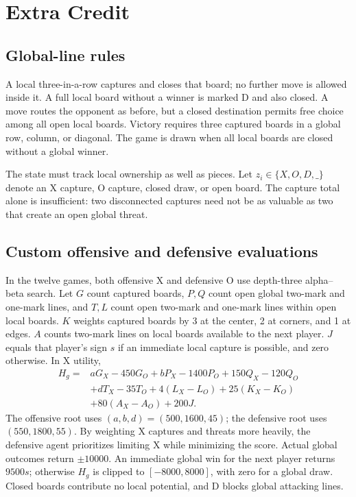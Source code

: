 \documentclass[UTF8,fontset=fandol,11pt,a4paper]{ctexart}
\begin{document}
\clearpage
\section{Extra Credit}
\subsection{Global-line rules}
A local three-in-a-row captures and closes that board; no further move
is allowed inside it. A full local board without a winner is marked D
and also closed. A move routes the opponent as before, but a closed
destination permits free choice among all open local boards. Victory
requires three captured boards in a global row, column, or diagonal.
The game is drawn when all local boards are closed without a global winner.

The state must track local ownership as well as pieces. Let
$z_i\in\{X,O,D,\_\}$ denote an X capture, O capture, closed draw, or open
board. The capture total alone is insufficient: two disconnected captures
need not be as valuable as two that create an open global threat.

\subsection{Custom offensive and defensive evaluations}
In the twelve games, both offensive X and defensive O
use depth-three alpha--beta search.
Let $G$ count captured boards, $P,Q$ count open global two-mark and
one-mark lines, and $T,L$ count open two-mark and one-mark lines within
open local boards. $K$ weights captured boards by 3 at the center,
2 at corners, and 1 at edges. $A$ counts two-mark lines on local boards
available to the next player. $J$ equals that player's sign $s$ if an
immediate local capture is possible, and zero otherwise. In X utility,
\begin{align*}
H_g={}&aG_X-450G_O+bP_X-1400P_O+150Q_X-120Q_O\\
 &+dT_X-35T_O+4(L_X-L_O)+25(K_X-K_O)\\
 &+80(A_X-A_O)+200J.
\end{align*}
The offensive root uses $(a,b,d)=(500,1600,45)$; the defensive root
uses $(550,1800,55)$. By weighting X captures and threats more heavily,
the defensive agent prioritizes limiting X while minimizing the score.
Actual global outcomes return $\pm10000$. An immediate global win for
the next player returns $9500s$; otherwise $H_g$ is clipped to
$[-8000,8000]$, with zero for a global draw. Closed boards contribute
no local potential, and D blocks global attacking lines.
\end{document}
